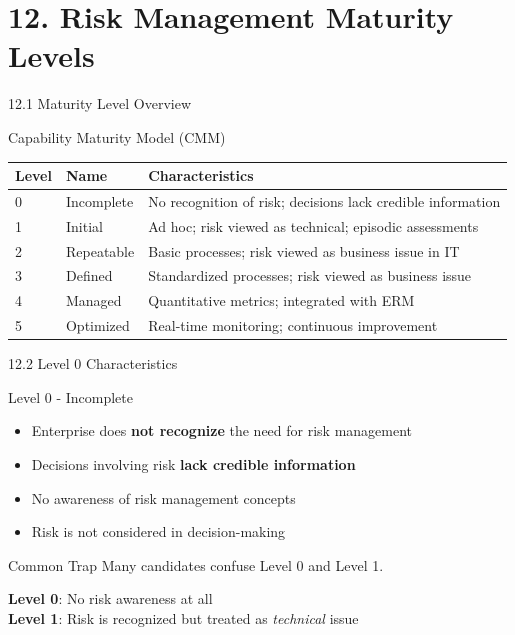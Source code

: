 \documentclass{beamer}
\begin{document}
	\section{12. Risk Management Maturity Levels}
	
	\begin{frame}{12.1 Maturity Level Overview}
		\begin{block}{Capability Maturity Model (CMM)}
			\begin{tabular}{|p{1.5cm}|p{3.5cm}|p{6cm}|}
				\hline
				\textbf{Level} & \textbf{Name} & \textbf{Characteristics} \\
				\hline
				0 & Incomplete & No recognition of risk; decisions lack credible information \\
				\hline
				1 & Initial & Ad hoc; risk viewed as technical; episodic assessments \\
				\hline
				2 & Repeatable & Basic processes; risk viewed as business issue in IT \\
				\hline
				3 & Defined & Standardized processes; risk viewed as business issue \\
				\hline
				4 & Managed & Quantitative metrics; integrated with ERM \\
				\hline
				5 & Optimized & Real-time monitoring; continuous improvement \\
				\hline
			\end{tabular}
		\end{block}
	\end{frame}
	
	\begin{frame}{12.2 Level 0 Characteristics}
		\begin{block}{Level 0 - Incomplete}
			\begin{itemize}
				\item Enterprise does \textbf{not recognize} the need for risk management
				\item Decisions involving risk \textbf{lack credible information}
				\item No awareness of risk management concepts
				\item Risk is not considered in decision-making
			\end{itemize}
		\end{block}
		
		\begin{alertblock}{Common Trap}
			Many candidates confuse Level 0 and Level 1.
			
			\textbf{Level 0}: No risk awareness at all \\
			\textbf{Level 1}: Risk is recognized but treated as \textit{technical} issue
		\end{alertblock}
	\end{frame}
	
\end{document}

